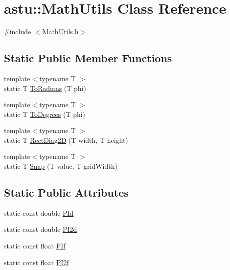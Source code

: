\hypertarget{classastu_1_1MathUtils}{}\section{astu\+:\+:Math\+Utils Class Reference}
\label{classastu_1_1MathUtils}


{\ttfamily \#include $<$Math\+Utils.\+h$>$}

\subsection*{Static Public Member Functions}
\begin{DoxyCompactItemize}
\item 
{\footnotesize template$<$typename T $>$ }\\static T \hyperlink{classastu_1_1MathUtils_a7b41244cc494ec40a70a7519b43ad548}{To\+Radians} (T phi)
\item 
{\footnotesize template$<$typename T $>$ }\\static T \hyperlink{classastu_1_1MathUtils_a84496e413d854bafe2a88a12f7e473da}{To\+Degrees} (T phi)
\item 
{\footnotesize template$<$typename T $>$ }\\static T \hyperlink{classastu_1_1MathUtils_af1b78d1d769e7f46ff0e819ac11b269b}{Rect\+Diag2D} (T width, T height)
\item 
{\footnotesize template$<$typename T $>$ }\\static T \hyperlink{classastu_1_1MathUtils_a635ccbb17b8e6ee4333ff8391b328ee0}{Snap} (T value, T grid\+Width)
\end{DoxyCompactItemize}
\subsection*{Static Public Attributes}
\begin{DoxyCompactItemize}
\item 
static const double \hyperlink{classastu_1_1MathUtils_a333f618d0f2a07c78ebddfcecc2dca2f}{P\+Id}
\item 
static const double \hyperlink{classastu_1_1MathUtils_ac646a16be0c1e1d8ce3ebcb9760d493c}{P\+I2d}
\item 
static const float \hyperlink{classastu_1_1MathUtils_a77d9d18581e2eb6aa0f3b79f455a9ed0}{P\+If}
\item 
static const float \hyperlink{classastu_1_1MathUtils_a94b505d6faeafedd5e882226f3cec47f}{P\+I2f}
\end{DoxyCompactItemize}


